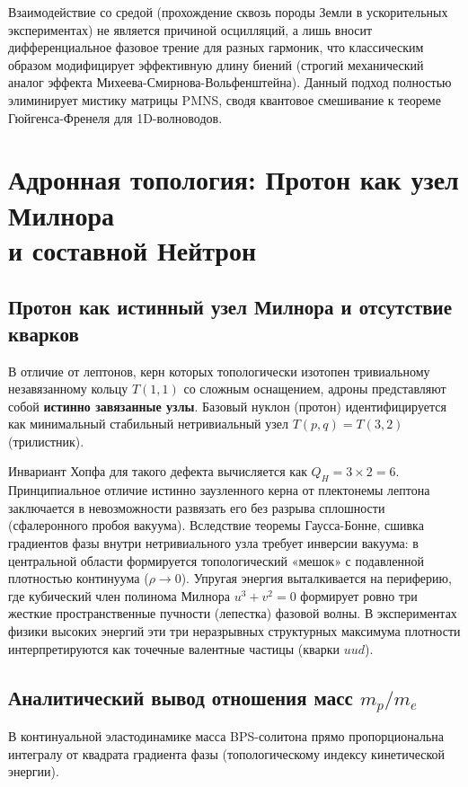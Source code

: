 \documentclass[11pt,a4paper]{article}
\begin{document}
	Взаимодействие со средой (прохождение сквозь породы Земли в ускорительных экспериментах) не является причиной осцилляций, а лишь вносит дифференциальное фазовое трение для разных гармоник, что классическим образом модифицирует эффективную длину биений (строгий механический аналог эффекта Михеева-Смирнова-Вольфенштейна). Данный подход полностью элиминирует мистику матрицы PMNS, сводя квантовое смешивание к теореме Гюйгенса-Френеля для 1D-волноводов.
	
	\section{Адронная топология: Протон как узел Милнора\\ и составной Нейтрон}
	
	\subsection{Протон как истинный узел Милнора и отсутствие кварков}
	В отличие от лептонов, керн которых топологически изотопен тривиальному незавязанному кольцу $T(1,1)$ со сложным оснащением, адроны представляют собой \textbf{истинно завязанные узлы}. 
	Базовый нуклон (протон) идентифицируется как минимальный стабильный нетривиальный узел $T(p,q) = T(3,2)$ (трилистник).
	
	Инвариант Хопфа для такого дефекта вычисляется как $Q_H = 3 \times 2 = 6$. 
	Принципиальное отличие истинно заузленного керна от плектонемы лептона заключается в невозможности развязать его без разрыва сплошности (сфалеронного пробоя вакуума). Вследствие теоремы Гаусса-Бонне, сшивка градиентов фазы внутри нетривиального узла требует инверсии вакуума: в центральной области формируется топологический «мешок» с подавленной плотностью континуума ($\rho \to 0$).
	Упругая энергия выталкивается на периферию, где кубический член полинома Милнора $u^3+v^2=0$ формирует ровно три жесткие пространственные пучности (лепестка) фазовой волны. В экспериментах физики высоких энергий эти три неразрывных структурных максимума плотности интерпретируются как точечные валентные частицы (кварки $uud$).
	
\subsection{Аналитический вывод отношения масс $m_p/m_e$}
В континуальной эластодинамике масса BPS-солитона прямо пропорциональна интегралу от квадрата градиента фазы (топологическому индексу кинетической энергии). 
\end{document}
